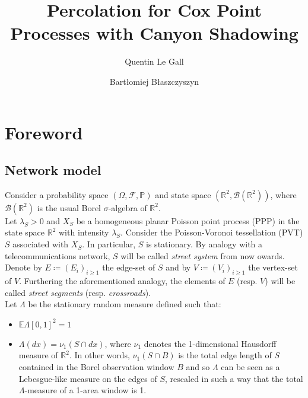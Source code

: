 \documentclass[10pt,a4paper]{amsart}
\theoremstyle{exampstyle}
\theoremstyle{exampnotations}
\begin{document}
\title{Percolation for Cox Point Processes with Canyon Shadowing}
\author{Quentin Le Gall}
\address{Orange Labs Networks, 44 avenue de la République 92320 Ch\^atillon}
\author{Bart\l{}omiej B\l{}aszczyszyn}
\address{Inria - \MakeUppercase{ens}, 2 rue Simone Iff CS42112 75589 Paris Cedex 12}
\maketitle
\tableofcontents
\section{Foreword}
\subsection{Network model}
\label{Ss.NetworkModel}
Consider a probability space $(\Omega, \mathcal{F}, \mathbb{P})$ and state space $(\mathbb{R}^{2}, \mathcal{B}(\mathbb{R}^{2}))$, where $\mathcal{B}(\mathbb{R}^{2})$ is the usual Borel $\sigma$-algebra of $\mathbb{R}^{2}$. \\

Let $\lambda_{S} > 0$ and $X_{S}$ be a homogeneous planar Poisson point process (PPP) in the state space $\mathbb{R}^{2}$ with intensity $\lambda_S$. Consider the Poisson-Voronoi tessellation (PVT) $S$ associated with $X_S$. In particular, $S$ is stationary. By analogy with a telecommunications network, $S$ will be called \emph{street system} from now owards. \\
\indent Denote by $E \coloneqq (E_{i})_{i \geq 1}$ the edge-set of $S$ and by $V \coloneqq (V_{i})_{i \geq 1}$ the vertex-set of $V$. Furthering the aforementioned analogy, the elements of $E$ (resp. $V$) will be called \emph{street segments} (resp. \emph{crossroads}). \\
\indent Let $\Lambda$ be the stationary random measure defined such that:
\begin{itemize}
\item $\mathbb{E} \Lambda \left[0,1\right]^{2} = 1$
\item $\Lambda(dx) = \nu_{1}(S \cap dx)$, where $\nu_{1}$ denotes the 1-dimensional Hausdorff measure of $\mathbb{R}^{2}$. In other words, $\nu_{1}(S \cap B)$ is the total edge length of $S$ contained in the Borel observation window $B$ and so $\Lambda$ can be seen as a Lebesgue-like measure on the edges of $S$, rescaled in such a way that the total $\Lambda$-measure of a 1-area window is 1. \\
\end{itemize}
\end{document}
